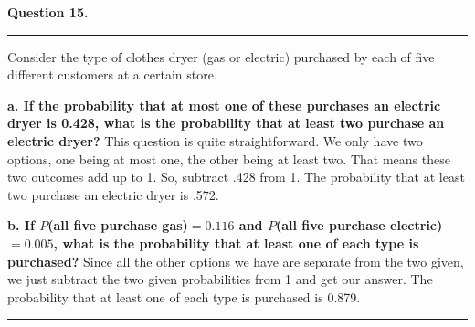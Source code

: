 \textbf{Question 15.} \\
\hrule 

Consider the type of clothes dryer (gas or electric) purchased by each of five different customers at a certain store.

\textbf{a. If the probability that at most one of these purchases an electric dryer is 0.428, what is the probability that at least two purchase an electric dryer?} \newline 
This question is quite straightforward. We only have two options, one being at most one, the other being at least two. That means these two outcomes add up to 1. So, subtract .428 from 1. The probability that at least two purchase an electric dryer is .572.

\textbf{b. If $P$(all five purchase gas)$= 0.116$ and $P$(all five purchase electric)$=0.005$, what is the probability that at least one of each type is purchased?} \newline 
Since all the other options we have are separate from the two given, we just subtract the two given probabilities from 1 and get our answer. The probability that at least one of each type is purchased is 0.879. \newline \bigskip 

\hrule 